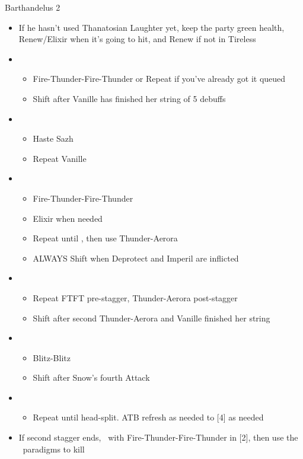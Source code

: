 \begin{battle}{Barthandelus 2}
\begin{multicols}{2}
\begin{itemize}
\begin{itemize}
    \end{itemize}
    \columnbreak
    \item If he hasn't used Thanatosian Laughter yet, keep the party green health, Renew/Elixir when it's going to hit, and Renew if not in Tireless
    \item \fifth
    \begin{itemize}
        \item Fire-Thunder-Fire-Thunder or Repeat if you've already got it queued
        \item Shift after Vanille has finished her string of 5 debuffs
    \end{itemize}
    \item \first
    \begin{itemize}
        \item Haste Sazh
        \item Repeat Vanille
    \end{itemize}
    \item \fifth
    \begin{itemize}
        \item Fire-Thunder-Fire-Thunder
        \item Elixir when needed
        \item Repeat until \stagger, then use Thunder-Aerora
        \item ALWAYS Shift when Deprotect and Imperil are inflicted
    \end{itemize}
    \item \second
    \begin{itemize}
        \item Repeat FTFT pre-stagger, Thunder-Aerora post-stagger
        \item Shift after second Thunder-Aerora and Vanille finished her string
    \end{itemize}
    \item \fourth
    \begin{itemize}
        \item Blitz-Blitz
        \item Shift after Snow's fourth Attack
    \end{itemize}
    \item \sixth
    \begin{itemize}
        \item Repeat until head-split. ATB refresh as needed to [4] as needed
    \end{itemize}
    \item If second stagger ends, \stagger\ with \linebreak Fire-Thunder-Fire-Thunder in [2], then use the \com\ paradigms to kill
\end{itemize}
\null
\end{multicols}
\end{battle}
